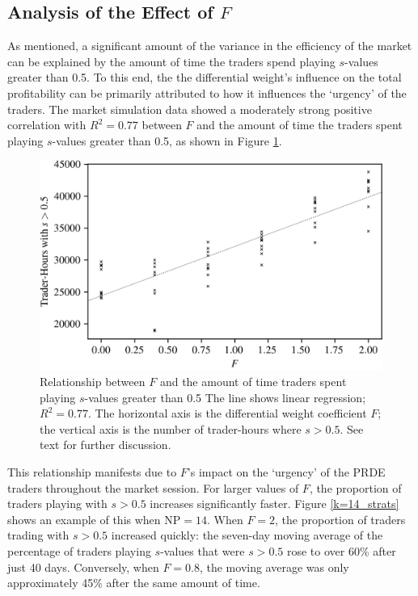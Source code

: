 \documentclass[conference]{IEEEtran}
\begin{document}
\subsection{Analysis of the Effect of $F$}

As mentioned, a significant amount of the variance in the efficiency of the market can be explained by the amount of time the traders spend playing $s$-values greater than 0.5.
To this end, the the differential weight's influence on the total profitability can be primarily attributed to how it influences the `urgency' of the traders.
The market simulation data showed a moderately strong positive correlation with $R^2=0.77$ between $F$ and the amount of time the traders spent playing $s$-values greater than 0.5, as shown in Figure \ref{F_strats}.

\begin{figure}[htbp]
    \centerline{\includegraphics[width=\columnwidth]{F_strats.png}}
    \caption{
        Relationship between $F$ and the amount of time traders spent playing $s$-values greater than 0.5
        The line shows linear regression; $R^2=0.77$.
        The horizontal axis is the differential weight coefficient $F$; the vertical axis is the number of trader-hours where $s>0.5$.
        See text for further discussion.
    }
    \label{F_strats}
\end{figure}

This relationship manifests due to $F$'s impact on the `urgency' of the PRDE traders throughout the market session.
For larger values of $F$, the proportion of traders playing with $s>0.5$ increases significantly faster.
Figure \ref{k=14_strats} shows an example of this when $\mathrm{NP}=14$.
When $F=2$, the proportion of traders trading with $s>0.5$ increased quickly: the seven-day moving average of the percentage of traders playing $s$-values that were $s>0.5$ rose to over 60\% after just 40 days.
Conversely, when $F=0.8$, the moving average was only approximately 45\% after the same amount of time.
\end{document}
